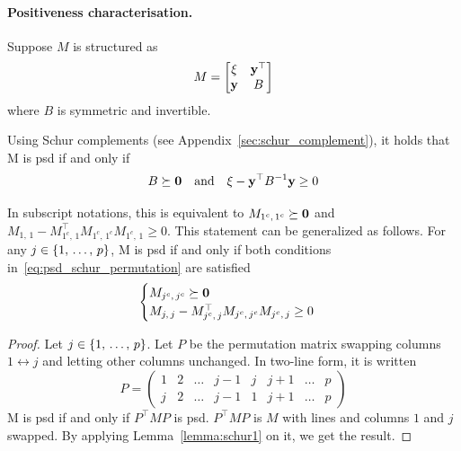 \paragraph{Positiveness characterisation.}
Suppose $M$ is structured as
\begin{equation*}
    M = \begin{bmatrix}
        \xi & \mathbf{y}^\top\\
        \mathbf{y} & B
    \end{bmatrix}
\end{equation*}
where $B$ is symmetric and invertible.
\begin{lemma}\label{lemma:schur1}
    Using Schur complements (see Appendix~\ref{sec:schur_complement}), it holds that M is psd if and only if
    \begin{equation*}
        B \succeq \mathbf{0}
        \quad\text{and}\quad
        \xi - \mathbf{y}^\top B^{-1} \mathbf{y} \geq 0
    \end{equation*}
\end{lemma}
In subscript notations, this is equivalent to $M_{1^c,\, 1^c} \succeq \mathbf{0}$ and
$M_{1,\, 1} - M_{1^c,\, 1}^\top M_{1^c,\, 1^c} M_{1^c,\, 1} \geq 0$.
This statement can be generalized as follows.
For any $j \in \left\{ 1,\, \dots,\, p \right\}$, M is psd if and only if both conditions in~\ref{eq:psd_schur_permutation} are satisfied
\begin{equation}\label{eq:psd_schur_permutation}
    \begin{cases}
        M_{j^c,\, j^c} \succeq \mathbf{0}\\
        M_{j,\, j} - M_{j^c,\, j}^\top M_{j^c,\, j^c} M_{j^c,\, j} \geq 0
    \end{cases}
\end{equation}
\begin{proof}
    Let $j \in \left\{ 1,\, \dots,\, p \right\}$.
    Let $P$ be the permutation matrix swapping columns $1 \leftrightarrow j$ and letting other columns unchanged.
    In two-line form, it is written
    \begin{equation*}
        P = \begin{pmatrix}
                1 & 2 & \dots & j - 1 & j & j + 1 & \dots & p\\
                j & 2 & \dots & j - 1 & 1 & j + 1 & \dots & p
        \end{pmatrix}
    \end{equation*}
    M is psd if and only if $P^\top M P$ is psd.
    $P^\top M P$ is $M$ with lines and columns $1$ and $j$ swapped.
    By applying Lemma~\ref{lemma:schur1} on it, we get the result.
\end{proof}

